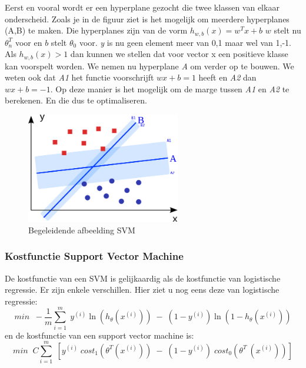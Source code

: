 Eerst en vooral wordt er een hyperplane gezocht die twee klassen van elkaar onderscheid. Zoals je in de figuur ziet is het mogelijk om meerdere hyperplanes (A,B) te maken. Die hyperplanes zijn van de vorm $h_{w,b}(x) = w^{T}x + b$ $w$ stelt nu $\theta_{n}^{T}$ voor en $b$ stelt $\theta_{0}$ voor. \textit{y} is nu geen element meer van {0,1} maar wel van {1,-1}. Als $h_{w,b}(x) > 1$ dan kunnen we stellen dat voor vector x een positieve klasse kan voorspelt worden. 
We nemen nu hyperplane \textit{A} om verder op te bouwen. We weten ook dat \textit{A1} het functie voorschrijft $w x +b=1$ heeft en \textit{A2} dan  $w x +b=-1$. Op deze manier is het mogelijk om de marge tussen \textit{A1} en \textit{A2} te berekenen. En die dus te optimaliseren.

\begin{figure}[]
	\centering
	\includegraphics[width=0.6\textwidth]{img/svmkopie}
	\caption{Begeleidende afbeelding SVM \autocite{svmGraph}}
	\label{fig:svm}
\end{figure}

\subsubsection{Kostfunctie Support Vector Machine}

De kostfunctie van een SVM is gelijkaardig als de kostfunctie van logistische regressie. Er zijn enkele verschillen. Hier ziet u nog eens deze van logistische regressie: 
$$ 
min \;\; -\frac{1}{m}\sum_{i=1}^{m} \;  y^{(i)}\ln(h_{\theta}(x^{(i)})) \;- \;(1-y^{(i)}) \ln(1-h_{\theta}(x^{(i)}))  
$$
en de kostfunctie van een support vector machine is: 
$$ 
min \;\; C\sum_{i=1}^{m} \; \left[ y^{(i)}\;cost_{1}(\theta^{T}(x^{(i)})) \;- \;(1-y^{(i)})\;cost_{0}(\theta^{T}\:(x^{(i)})) \right] 
$$

